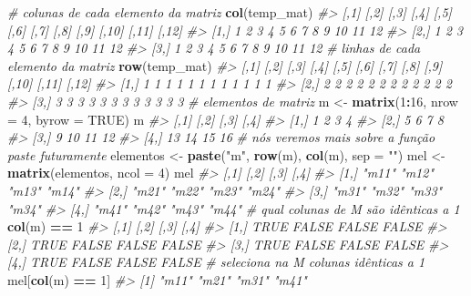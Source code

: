 \documentclass[]{book}
\newenvironment{Shaded}{\begin{snugshade}}{\end{snugshade}}
\newcommand{\KeywordTok}[1]{\textcolor[rgb]{0.13,0.29,0.53}{\textbf{#1}}}
\newcommand{\DataTypeTok}[1]{\textcolor[rgb]{0.13,0.29,0.53}{#1}}
\newcommand{\DecValTok}[1]{\textcolor[rgb]{0.00,0.00,0.81}{#1}}
\newcommand{\StringTok}[1]{\textcolor[rgb]{0.31,0.60,0.02}{#1}}
\newcommand{\CommentTok}[1]{\textcolor[rgb]{0.56,0.35,0.01}{\textit{#1}}}
\newcommand{\OtherTok}[1]{\textcolor[rgb]{0.56,0.35,0.01}{#1}}
\newcommand{\OperatorTok}[1]{\textcolor[rgb]{0.81,0.36,0.00}{\textbf{#1}}}
\newcommand{\NormalTok}[1]{#1}
\begin{document}
\begin{Shaded}
\begin{Highlighting}[]
\CommentTok{# colunas de cada elemento da matriz}
\KeywordTok{col}\NormalTok{(temp_mat)}
\CommentTok{#>      [,1] [,2] [,3] [,4] [,5] [,6] [,7] [,8] [,9] [,10] [,11] [,12]}
\CommentTok{#> [1,]    1    2    3    4    5    6    7    8    9    10    11    12}
\CommentTok{#> [2,]    1    2    3    4    5    6    7    8    9    10    11    12}
\CommentTok{#> [3,]    1    2    3    4    5    6    7    8    9    10    11    12}
\CommentTok{# linhas de cada elemento da matriz}
\KeywordTok{row}\NormalTok{(temp_mat)}
\CommentTok{#>      [,1] [,2] [,3] [,4] [,5] [,6] [,7] [,8] [,9] [,10] [,11] [,12]}
\CommentTok{#> [1,]    1    1    1    1    1    1    1    1    1     1     1     1}
\CommentTok{#> [2,]    2    2    2    2    2    2    2    2    2     2     2     2}
\CommentTok{#> [3,]    3    3    3    3    3    3    3    3    3     3     3     3}
\CommentTok{# elementos de matriz}
\NormalTok{m <-}\StringTok{ }\KeywordTok{matrix}\NormalTok{(}\DecValTok{1}\OperatorTok{:}\DecValTok{16}\NormalTok{, }\DataTypeTok{nrow =} \DecValTok{4}\NormalTok{, }\DataTypeTok{byrow =} \OtherTok{TRUE}\NormalTok{)}
\NormalTok{m}
\CommentTok{#>      [,1] [,2] [,3] [,4]}
\CommentTok{#> [1,]    1    2    3    4}
\CommentTok{#> [2,]    5    6    7    8}
\CommentTok{#> [3,]    9   10   11   12}
\CommentTok{#> [4,]   13   14   15   16}
\CommentTok{# nós veremos mais sobre a função paste futuramente}
\NormalTok{elementos <-}\StringTok{ }\KeywordTok{paste}\NormalTok{(}\StringTok{"m"}\NormalTok{, }\KeywordTok{row}\NormalTok{(m), }\KeywordTok{col}\NormalTok{(m), }\DataTypeTok{sep =} \StringTok{""}\NormalTok{)}
\NormalTok{mel <-}\StringTok{ }\KeywordTok{matrix}\NormalTok{(elementos, }\DataTypeTok{ncol =} \DecValTok{4}\NormalTok{)}
\NormalTok{mel}
\CommentTok{#>      [,1]  [,2]  [,3]  [,4] }
\CommentTok{#> [1,] "m11" "m12" "m13" "m14"}
\CommentTok{#> [2,] "m21" "m22" "m23" "m24"}
\CommentTok{#> [3,] "m31" "m32" "m33" "m34"}
\CommentTok{#> [4,] "m41" "m42" "m43" "m44"}
\CommentTok{# qual colunas de M são idênticas a 1}
\KeywordTok{col}\NormalTok{(m) }\OperatorTok{==}\StringTok{ }\DecValTok{1}
\CommentTok{#>      [,1]  [,2]  [,3]  [,4]}
\CommentTok{#> [1,] TRUE FALSE FALSE FALSE}
\CommentTok{#> [2,] TRUE FALSE FALSE FALSE}
\CommentTok{#> [3,] TRUE FALSE FALSE FALSE}
\CommentTok{#> [4,] TRUE FALSE FALSE FALSE}
\CommentTok{# seleciona na M colunas idênticas a 1}
\NormalTok{mel[}\KeywordTok{col}\NormalTok{(m) }\OperatorTok{==}\StringTok{ }\DecValTok{1}\NormalTok{]}
\CommentTok{#> [1] "m11" "m21" "m31" "m41"}

\end{Highlighting}
\end{Shaded}
\end{document}

